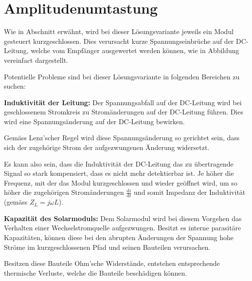\section{Amplitudenumtastung}
\label{sec:simu:ask}

Wie in Abschnitt  erw\"ahnt, wird bei dieser L\"osungsvariante
jeweils   ein   Modul   gesteuert   kurzgeschlossen. Dies   verursacht   kurze
Spannungseinbr\"uche auf  der DC-Leitung,  welche vom  Empf\"anger ausgewertet
werden k\"onnen, wie in Abbildung vereinfact dargestellt.

Potentielle Probleme sind bei  dieser L\"osungsvariante in folgenden Bereichen
zu suchen:

\begin{symbols}
    \firmlist
    \item[\textbf{Induktivit\"at der Leitung:}]
        Der  Spannungsabfall   auf  der  DC-Leitung  wird   bei  geschlossenem
        Stromkreis zu Strom\"anderungen auf der DC-Leitung f\"uhren. Dies wird
        eine Spannungs\"anderung auf der DC-Leitung bewirken\footnotemark.

        Gem\"ass    Lenz'scher     Regel         wird    diese
        Spannungs\"anderung  so gerichtet  sein,  dass  sich der  zugeh\"orige
        Strom der aufgezwungenen \"Anderung widersetzt.

        Es  kann also  sein, dass  die  Induktivit\"at der  DC-Leitung das  zu
        \"ubertragende  Signal  so  stark  kompensiert,  dass  es  nicht  mehr
        detektierbar  ist. Je   h\"oher  die  Frequenz,  mit   der  das  Modul
        kurzgeschlossen  und  wieder  ge\"offnet   wird,  um  so  h\"oher  die
        zugeh\"origen Strom\"anderungen
        $\frac{\mathrm{d}i}{\mathrm{d}{t}}$
        und somit Impedanz der Induktivit\"at (gem\"ass
        $Z_L = j \omega L$).
    \item[\textbf{Kapazit\"at des Solarmoduls:}]
        Dem  Solarmodul   wird  bei   diesem  Vorgehen  das   Verhalten  einer
        Wechselstromquelle   aufgezwungen. Besitzt  es   interne  parasit\"are
        Kapazit\"aten,  k\"onnen  diese  bei  den  abrupten  \"Anderungen  der
        Spannung hohe Str\"ome im  kurzgeschlossenen Pfad und seinen Bauteilen
        verursachen.\footnotemark

        Besitzen    diese   Bauteile    Ohm'sche   Widerst\"ande,    entstehen
        entsprechende thermische  Verluste, welche die  Bauteile besch\"adigen
        k\"onnen.
\end{symbols}

